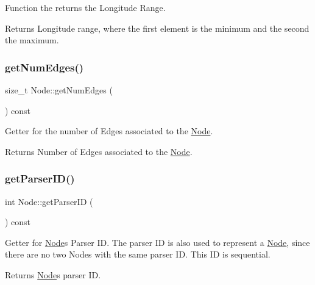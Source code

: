 Function the returns the Longitude Range.

\begin{DoxyReturn}{Returns}
Longitude range, where the first element is the minimum and the second the maximum. 
\end{DoxyReturn}
\hypertarget{class_node_abc4a69053f8f664c9b6a6a6bbe5d8c68}{}\label{class_node_abc4a69053f8f664c9b6a6a6bbe5d8c68} 
\subsubsection{\texorpdfstring{get\+Num\+Edges()}{getNumEdges()}}
{\footnotesize\ttfamily size\+\_\+t Node\+::get\+Num\+Edges (\begin{DoxyParamCaption}{ }\end{DoxyParamCaption}) const}

Getter for the number of Edges associated to the \hyperlink{class_node}{Node}.

\begin{DoxyReturn}{Returns}
Number of Edges associated to the \hyperlink{class_node}{Node}. 
\end{DoxyReturn}
\hypertarget{class_node_ab79cb8588caac0a2d0dd99d7e7dd2f28}{}\label{class_node_ab79cb8588caac0a2d0dd99d7e7dd2f28} 
\subsubsection{\texorpdfstring{get\+Parser\+I\+D()}{getParserID()}}
{\footnotesize\ttfamily int Node\+::get\+Parser\+ID (\begin{DoxyParamCaption}{ }\end{DoxyParamCaption}) const}

Getter for \hyperlink{class_node}{Node}\textquotesingle{}s Parser ID. The parser ID is also used to represent a \hyperlink{class_node}{Node}, since there are no two Nodes with the same parser ID. This ID is sequential.

\begin{DoxyReturn}{Returns}
\hyperlink{class_node}{Node}\textquotesingle{}s parser ID. 
\end{DoxyReturn}
\hypertarget{class_node_a73562032360227efd9fe93d07ab2475f}{}\label{class_node_a73562032360227efd9fe93d07ab2475f} 
